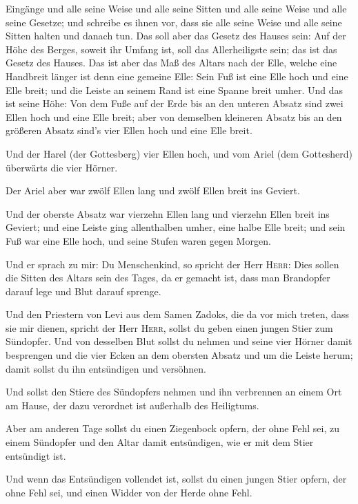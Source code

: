 Eingänge und alle seine Weise und alle seine Sitten und alle seine Weise
und alle seine Gesetze; und schreibe es ihnen vor, dass sie alle seine
Weise und alle seine Sitten halten und danach tun.  Das
soll aber das Gesetz des Hauses sein: Auf der Höhe des Berges, soweit
ihr Umfang ist, soll das Allerheiligste sein; das ist das Gesetz des
Hauses.  Das ist aber das Maß des Altars nach der Elle,
welche eine Handbreit länger ist denn eine gemeine Elle: Sein Fuß ist
eine Elle hoch und eine Elle breit; und die Leiste an seinem Rand ist
eine Spanne breit umher.  Und das ist seine Höhe: Von dem
Fuße auf der Erde bis an den unteren Absatz sind zwei Ellen hoch und
eine Elle breit; aber von demselben kleineren Absatz bis an den größeren
Absatz sind's vier Ellen hoch und eine Elle breit.

 Und der Harel (der Gottesberg) vier Ellen hoch, und vom
Ariel (dem Gottesherd) überwärts die vier Hörner.

 Der Ariel aber war zwölf Ellen lang und zwölf Ellen
breit ins Geviert.

 Und der oberste Absatz war vierzehn Ellen lang und
vierzehn Ellen breit ins Geviert; und eine Leiste ging allenthalben
umher, eine halbe Elle breit; und sein Fuß war eine Elle hoch, und seine
Stufen waren gegen Morgen.

 Und er sprach zu mir: Du Menschenkind, so spricht der
Herr \textsc{Herr}: Dies sollen die Sitten des Altars sein des Tages, da
er gemacht ist, dass man Brandopfer darauf lege und Blut darauf sprenge.

 Und den Priestern von Levi aus dem Samen Zadoks, die da
vor mich treten, dass sie mir dienen, spricht der Herr \textsc{Herr},
sollst du geben einen jungen Stier zum Sündopfer.  Und
von desselben Blut sollst du nehmen und seine vier Hörner damit
besprengen und die vier Ecken an dem obersten Absatz und um die Leiste
herum; damit sollst du ihn entsündigen und versöhnen.

 Und sollst den Stiere des Sündopfers nehmen und ihn
verbrennen an einem Ort am Hause, der dazu verordnet ist außerhalb des
Heiligtums.

 Aber am anderen Tage sollst du einen Ziegenbock opfern,
der ohne Fehl sei, zu einem Sündopfer und den Altar damit entsündigen,
wie er mit dem Stier entsündigt ist.

 Und wenn das Entsündigen vollendet ist, sollst du einen
jungen Stier opfern, der ohne Fehl sei, und einen Widder von der Herde
ohne Fehl.

